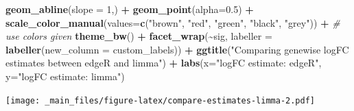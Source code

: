 \documentclass[
]{book}
\newenvironment{Shaded}{\begin{snugshade}}{\end{snugshade}}
\newcommand{\AttributeTok}[1]{\textcolor[rgb]{0.13,0.29,0.53}{#1}}
\newcommand{\CommentTok}[1]{\textcolor[rgb]{0.56,0.35,0.01}{\textit{#1}}}
\newcommand{\DecValTok}[1]{\textcolor[rgb]{0.00,0.00,0.81}{#1}}
\newcommand{\FloatTok}[1]{\textcolor[rgb]{0.00,0.00,0.81}{#1}}
\newcommand{\FunctionTok}[1]{\textcolor[rgb]{0.13,0.29,0.53}{\textbf{#1}}}
\newcommand{\NormalTok}[1]{#1}
\newcommand{\SpecialCharTok}[1]{\textcolor[rgb]{0.81,0.36,0.00}{\textbf{#1}}}
\newcommand{\StringTok}[1]{\textcolor[rgb]{0.31,0.60,0.02}{#1}}
\begin{document}
\begin{Shaded}
\begin{Highlighting}[]
  \FunctionTok{geom\_abline}\NormalTok{(}\AttributeTok{slope =} \DecValTok{1}\NormalTok{,) }\SpecialCharTok{+}
  \FunctionTok{geom\_point}\NormalTok{(}\AttributeTok{alpha=}\FloatTok{0.5}\NormalTok{) }\SpecialCharTok{+}
  \FunctionTok{scale\_color\_manual}\NormalTok{(}\AttributeTok{values=}\FunctionTok{c}\NormalTok{(}\StringTok{"brown"}\NormalTok{, }\StringTok{"red"}\NormalTok{, }\StringTok{"green"}\NormalTok{, }\StringTok{"black"}\NormalTok{, }\StringTok{"grey"}\NormalTok{)) }\SpecialCharTok{+} \CommentTok{\# use colors given}
  \FunctionTok{theme\_bw}\NormalTok{() }\SpecialCharTok{+}
  \FunctionTok{facet\_wrap}\NormalTok{(}\SpecialCharTok{\textasciitilde{}}\NormalTok{sig, }\AttributeTok{labeller =} \FunctionTok{labeller}\NormalTok{(}\AttributeTok{new\_column =}\NormalTok{ custom\_labels)) }\SpecialCharTok{+}
  \FunctionTok{ggtitle}\NormalTok{(}\StringTok{"Comparing genewise logFC estimates between edgeR and limma"}\NormalTok{) }\SpecialCharTok{+}
  \FunctionTok{labs}\NormalTok{(}\AttributeTok{x=}\StringTok{"logFC estimate: edgeR"}\NormalTok{, }\AttributeTok{y=}\StringTok{"logFC estimate: limma"}\NormalTok{)}
\end{Highlighting}
\end{Shaded}

\texttt{[image: \_main\_files/figure-latex/compare-estimates-limma-2.pdf]}
\end{document}

